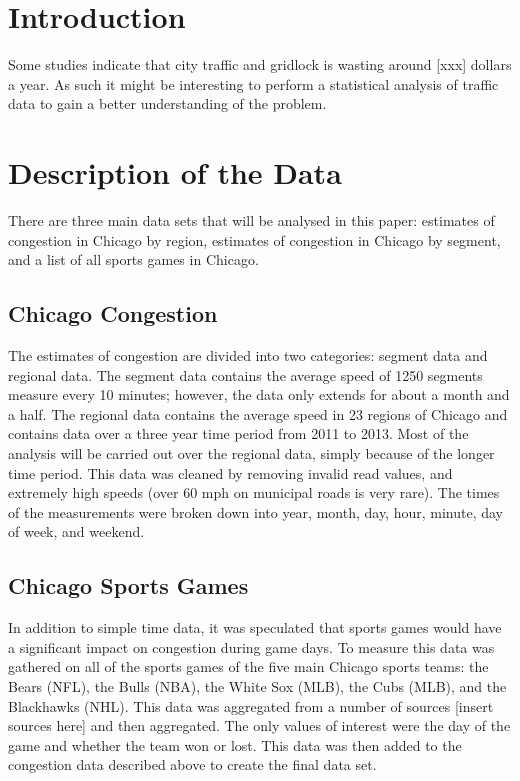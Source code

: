 \documentclass[12pt]{article}
\begin{document}
\maketitle
\section{Introduction}
Some studies indicate that city traffic and gridlock is wasting around [xxx] dollars a year. As such it might be interesting to perform a statistical analysis of traffic data to gain a better understanding of the problem.
\section{Description of the Data}
There are three main data sets that will be analysed in this paper: estimates of congestion in Chicago by region, estimates of congestion in Chicago by segment, and a list of all sports games in Chicago.
\subsection{Chicago Congestion}
The estimates of congestion are divided into two categories: segment data and regional data. The segment data contains the average speed of 1250 segments measure every 10 minutes; however, the data only extends for about a month and a half. The regional data contains the average speed in 23 regions of Chicago and contains data over a three year time period from 2011 to 2013. Most of the analysis will be carried out over the regional data, simply because of the longer time period. This data was cleaned by removing invalid read values, and extremely high speeds (over 60 mph on municipal roads is very rare). The times of the measurements were broken down into year, month, day, hour, minute, day of week, and weekend. 
\subsection{Chicago Sports Games}
In addition to simple time data, it was speculated that sports games would have a significant impact on congestion during game days. To measure this data was gathered on all of the sports games of the five main Chicago sports teams: the Bears (NFL), the Bulls (NBA), the White Sox (MLB), the Cubs (MLB), and the Blackhawks (NHL). This data was aggregated from a number of sources [insert sources here] and then aggregated. The only values of interest were the day of the game and whether the team won or lost. This data was then added to the congestion data described above to create the final data set.
\end{document}
